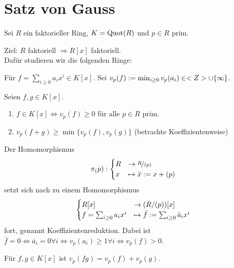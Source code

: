 \section{Satz von Gauss}
Sei $R$ ein faktorieller Ring, $K= \operatorname{Quot}(R)$ und $p \in R$ prim.

\begin{remark}
	Ziel: $R$ faktoriell $\Rightarrow R[x]$ faktoriell.\\
	Dafür studieren wir die folgenden Ringe:
\end{remark}

\begin{definition}
	Für $f = \sum_{i \ge 0} a_i x^i \in K[x]$. Sei $v_p(f) := \min_{i \ge 0} v_p(a_i) \in <Z> \cup \{\infty\}$.
\end{definition}

\begin{remark}
	Seien $f,g \in K[x]$.
	\begin{enumerate}
		\item $f \in K[x] \Leftrightarrow v_p(f) \ge 0$ für alle $p \in R$ prim.
		\item $v_p(f+g) \ge \min\{v_p(f), v_p(g)\}$ (betrachte Koeffizientenweise)
	\end{enumerate}
\end{remark}

\begin{definition}
	Der Homomorphismus
	\begin{align}
	\pi_(p): \begin{cases}
	R &\to \lnkset{R}{(p)} \\
	x &\mapsto \bar{x} := x + (p)
	\end{cases}\notag
	\end{align}
	setzt sich nach  zu einem Homomorphismus
	\begin{align}
	\begin{cases}
		R[x] &\to (R/(p))[x]\\
		f=\sum_{i \ge 0} a_i x^i &\mapsto \bar{f} := \sum_{i \ge 0} \bar{a}_i x^i
	\end{cases}\notag
	\end{align}
	fort, genannt Koeffizientenreduktion. Dabei ist $\bar{f} = 0 \Leftrightarrow \bar{a}_i = 0 \forall i \Leftrightarrow v_p(a_i) \ge 1 \forall i \Leftrightarrow v_p(f) > 0$.
\end{definition}

\begin{proposition}
	Für $f,g \in K[x]$ ist $v_p(fg) = v_p(f)+v_p(g)$.
\end{proposition}

